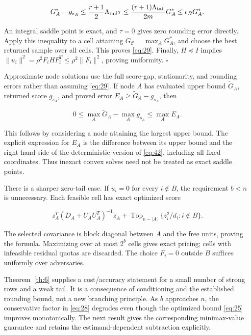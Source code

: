 \documentclass[11pt]{article}
\begin{document}
\[
G_A^*-g_{s_A}
\le\frac{r+1}{2}\Lambda_{\rm tail}\tau
\le\frac{(r+1)\Lambda_{\rm tail}}{2m}G_A^*
\le\epsilon_B G_A^*.
\]

An integral saddle point is exact, and \(\tau=0\) gives zero rounding
error directly. Apply this inequality to a cell attaining
\(G_{\mathcal C}=\max_A G_A^*\), and choose the best returned sample
over all cells. This proves \eqref{eq:29}. Finally, \(H\preceq I\)
implies \(\|u_i\|^2=\rho^2F_iHF_i^T\le\rho^2\|F_i\|^2\), proving
uniformity. \(\square\)

Approximate node solutions use the full score-gap, stationarity, and
rounding errors rather than assuming \eqref{eq:29}. If node \(A\) has
evaluated upper bound \(\widetilde G_A\), returned score \(g_{s_A}\),
and proved error \(E_A\ge\widetilde G_A-g_{s_A}\), then

\begin{equation}\label{eq:30}
0\le\max_A\widetilde G_A-\max_Ag_{s_A}\le\max_AE_A. 
\end{equation}

This follows by considering a node attaining the largest upper bound.
The explicit expression for \(E_A\) is the difference between its upper
bound and the right-hand side of the deterministic version of
\eqref{eq:42}, including all fixed coordinates. Thus inexact convex
solves need not be treated as exact saddle points.

There is a sharper zero-tail case. If \(u_i=0\) for every \(i\notin B\),
the requirement \(b<n\) is unnecessary. Each feasible cell has exact
optimized score

\begin{equation}\label{eq:31}
z_A^T(D_A+U_AU_A^T)^{-1}z_A
+\operatorname{Top}_{n-|A|}\{z_i^2/d_i:i\notin B\}. 
\end{equation}

The selected covariance is block diagonal between \(A\) and the free
units, proving the formula. Maximizing over at most \(2^b\) cells gives
exact pricing; cells with infeasible residual quotas are discarded. The
choice \(F_i=0\) outside \(B\) suffices uniformly over adversaries.

Theorem~\ref{th:6} supplies a cost/accuracy statement
for a small number of strong rows and a weak tail. It is a consequence
of conditioning and the established rounding bound, not a new branching
principle. As \(b\) approaches \(n\), the conservative factor in
\eqref{eq:28} degrades even though the optimized bound \eqref{eq:25}
improves monotonically. The next result gives the corresponding
minimax-value guarantee and retains the estimand-dependent subtraction
explicitly.
\end{document}
